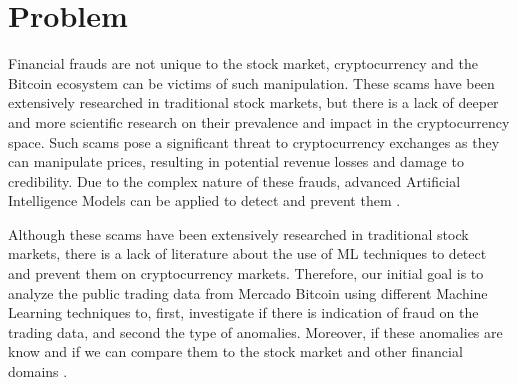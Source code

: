 \section{Problem}
Financial frauds are not unique to the stock market, cryptocurrency and the Bitcoin ecosystem can be victims of such
manipulation. These scams have been extensively researched in traditional stock markets, but there is a lack of deeper
and more scientific research on their prevalence and impact in the cryptocurrency space. Such scams pose a significant
threat to cryptocurrency exchanges as they can manipulate prices, resulting in potential revenue losses and damage to
credibility. Due to the complex nature of these frauds, advanced Artificial Intelligence Models can be applied to detect
and prevent them \cite{zhang2020financial, zainal2018review}.

Although these scams have been extensively researched in traditional stock markets, there is a lack of literature about
the use of ML techniques to detect and prevent them on cryptocurrency markets. Therefore, our initial goal is to analyze
the public trading data from Mercado Bitcoin using different Machine Learning techniques to, first, investigate if there
is indication of fraud on the trading data, and second the type of anomalies. Moreover, if these anomalies are know and
if we can compare them to the stock market and other financial domains \cite{bhattacharyya2011survey}.